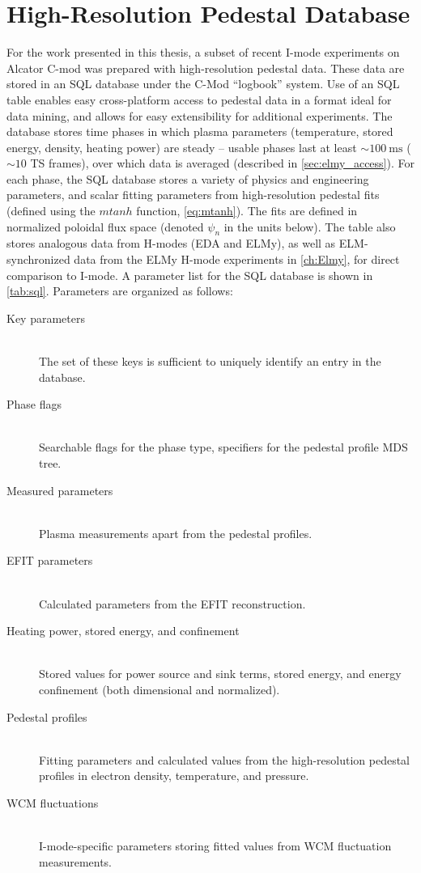\chapter{High-Resolution Pedestal Database}\label{app:sql}

For the work presented in this thesis, a subset of recent I-mode experiments on Alcator C-mod was prepared with high-resolution pedestal data.  These data are stored in an SQL database under the C-Mod ``logbook'' system.  Use of an SQL table enables easy cross-platform access to pedestal data in a format ideal for data mining, and allows for easy extensibility for additional experiments.  The database stores time phases in which plasma parameters (\eg temperature, stored energy, density, heating power) are steady -- usable phases last at least $\sim \SI{100}{\milli\second}$ ($\sim 10$ TS frames), over which data is averaged (described in \cref{sec:elmy_access}).  For each phase, the SQL database stores a variety of physics and engineering parameters, and scalar fitting parameters from high-resolution pedestal fits (defined using the $mtanh$ function, \cref{eq:mtanh}).  The fits are defined in normalized poloidal flux space (denoted $\psi_n$ in the units below).  The table also stores analogous data from H-modes (EDA and ELMy), as well as ELM-synchronized data from the ELMy H-mode experiments in \cref{ch:Elmy}, for direct comparison to I-mode.  A parameter list for the SQL database is shown in \cref{tab:sql}.  Parameters are organized as follows:

\begin{description}
 \item[Key parameters] \hfill \\
 The set of these keys is sufficient to uniquely identify an entry in the database.
 \item[Phase flags] \hfill \\
 Searchable flags for the phase type, specifiers for the pedestal profile MDS tree.
 \item[Measured parameters] \hfill \\
 Plasma measurements apart from the pedestal profiles.
 \item[EFIT parameters] \hfill \\
 Calculated parameters from the EFIT reconstruction.
 \item[Heating power, stored energy, and confinement] \hfill \\
 Stored values for power source and sink terms, stored energy, and energy confinement (both dimensional and normalized).
 \item[Pedestal profiles] \hfill \\
 Fitting parameters and calculated values from the high-resolution pedestal profiles in electron density, temperature, and pressure.
 \item[WCM fluctuations] \hfill \\
 I-mode-specific parameters storing fitted values from WCM fluctuation measurements.\nicechapterending
\end{description}

